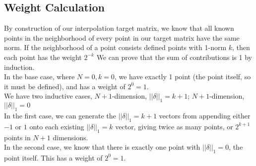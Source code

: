 \documentclass[11pt, oneside]{article}   	%
\begin{document}
\subsection{Weight Calculation}
By construction of our interpolation target matrix, we know that all known points in the neighborhood of every point in our target matrix have the same norm. If the neighborhood of a point consists defined points with 1-norm $k$, then each point has the weight $2^{-k}$ We can prove that the sum of contributions is 1 by induction.\\

In the base case, where $N=0, k=0$, we have exactly 1 point (the point itself, so it must be defined), and has a weight of $2^0 = 1$.\\

We have two inductive cases, $N+1$-dimension, $||\delta||_1 = k+1$; $N+1$-dimension, $||\delta||_1 = 0$\\

In the first case, we can generate the $||\delta||_1 = k+1$ vectors from appending either $-1$ or $1$ onto each existing $||\delta||_1 = k$ vector, giving twice as many points, or $2^{k+1}$ points in $N+1$ dimensions.\\

In the second case, we know that there is exactly one point with $||\delta||_1 = 0$, the point itself. This has a weight of $2^0 = 1$.\\
\end{document}
